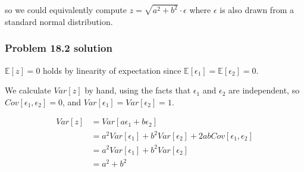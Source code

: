 \documentclass[
10pt, %
a4paper, %
oneside, %
headinclude,footinclude, %
BCOR5mm, %
]{scrartcl}
\begin{document}
so we could equivalently compute $z = \sqrt{a^2 + b^2} \cdot \epsilon$ where $\epsilon$ is also drawn from a standard normal distribution.

\subsubsection*{Problem 18.2 solution}

$\mathbb{E}[z] = 0$ holds by linearity of expectation since $\mathbb{E}[\epsilon_1] = \mathbb{E}[\epsilon_2] = 0$.

We calculate $Var[z]$ by hand, using the facts that $\epsilon_1$ and $\epsilon_2$ are independent, so $Cov[\epsilon_1, \epsilon_2] = 0$, and $Var[\epsilon_1] = Var[\epsilon_2] = 1$.

\begin{align*}
  Var[z] &= Var[a \epsilon_1 + b \epsilon_2] \\
  &= a^2 Var[\epsilon_1] + b^2 Var[\epsilon_2] + 2ab Cov[\epsilon_1, \epsilon_2] \\
  &= a^2 Var[\epsilon_1] + b^2 Var[\epsilon_2] \\
  &= a^2 + b^2
\end{align*}


\end{document}
